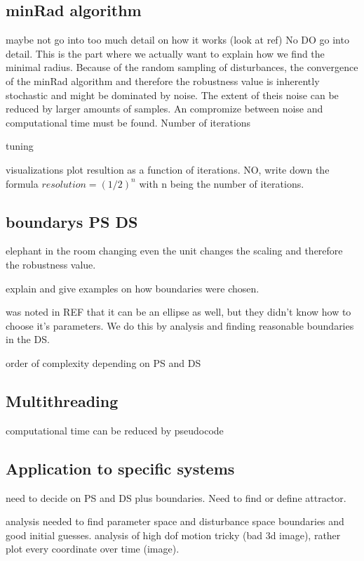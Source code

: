 \subsection{minRad algorithm}
    
    maybe not go into too much detail on how it works (look at ref)
    No DO go into detail. This is the part where we actually want to explain how we find the minimal radius. 
    Because of the random sampling of disturbances, the convergence of the minRad algorithm and therefore the robustness value is inherently stochastic and might be dominated by noise. The extent of theis noise can be reduced by larger amounts of samples. An compromize between noise and computational time must be found.
    Number of iterations
    
    tuning

    visualizations
    plot resultion as a function of iterations. NO, write down the formula $resolution = (1/2)^n$ with n being the number of iterations. 

\subsection{boundarys PS DS}

    

    elephant in the room 
    changing even the unit changes the scaling and therefore the robustness value.

    explain and give examples on how boundaries were chosen. 

    was noted in REF that it can be an ellipse as well, but they didn't know how to choose it's parameters. We do this by analysis and finding reasonable boundaries in the DS.

    order of complexity depending on PS and DS

\subsection{Multithreading}

    computational time can be reduced by 
    pseudocode

\subsection{Application to specific systems}
    

    need to decide on PS and DS plus boundaries. Need to find or define attractor. 

    analysis needed to find parameter space and disturbance space boundaries and good initial guesses.
    analysis of high dof motion tricky (bad 3d image), rather plot every coordinate over time (image). 

